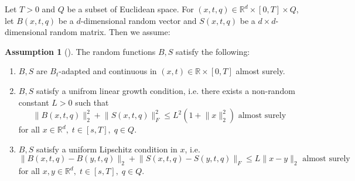 \documentclass[12pt]{article}
\theoremstyle{definition}
\newtheorem{assumption}[assumption]{Assumption}
\numberwithin{equation}{section}
\newcommand{\R}{\mathbb{R}}
\newcommand{\norm}[1]{\lVert{#1}\rVert_2}
\newcommand{\normf}[1]{\lVert{#1}\rVert_F}
\begin{document}
Let $T > 0$ and $Q$ be a subset of Euclidean space. For $(x,t,q) \in \R^d \times [0,T] \times Q$, let $B(x,t,q)$ be a $d$-dimensional random vector and $S(x,t,q)$ be a $d \times d$-dimensional random matrix. Then we assume: 
\begin{assumption}[]
  \label{as:sde_existence}
  The random functions $B,S$ satisfy the following:
  \begin{enumerate}[label=(\roman*)]
    \item $B,S$ are $B_t$-adapted and continuous in $(x,t) \in \R \times [0,T]$ almost surely.
    \item $B,S$ satisfy a unifrom linear growth condition, i.e. there exists a non-random constant $L > 0$ such that
    \begin{equation*}
      \norm{B(x,t,q)}^2 + \normf{S(x,t,q)}^2 \leq L^2 (1 + \norm{x}^2) \text{ almost surely}
    \end{equation*}
    for all $x \in \R^d, \; t \in [s,T], \; q \in Q$.
    \item $B,S$ satisfy a uniform Lipschitz condition in $x$, i.e.
    \begin{equation*}
      \norm{B(x,t,q) - B(y,t,q)} + \normf{S(x,t,q) - S(y,t,q)} \leq L \norm{x - y}  \text{ almost surely}
    \end{equation*}
    for all $x,y \in \R^d, \; t \in [s, T], \; q \in Q$.
  \end{enumerate}
\end{assumption}
\end{document}
